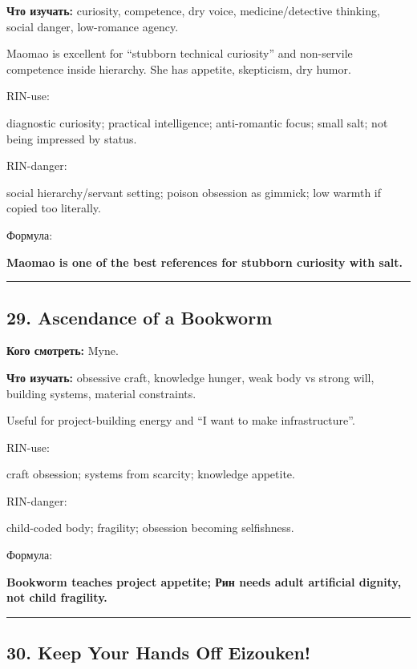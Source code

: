 \textbf{Что изучать:} curiosity, competence, dry voice,
medicine/\hspace{0pt}detective thinking, social danger, low-romance agency.

Maomao is excellent for ``stubborn technical curiosity'' and non-servile
competence inside hierarchy. She has appetite, skepticism, dry humor.

RIN-use:

diagnostic curiosity; practical intelligence; anti-romantic focus; small
salt; not being impressed by status.

RIN-danger:

social hierarchy/\hspace{0pt}servant setting; poison obsession as gimmick; low
warmth if copied too literally.

Формула:

\textbf{Maomao is one of the best references for stubborn curiosity with
salt.}

\begin{center}\rule{0.5\linewidth}{0.5pt}\end{center}

\subsection*{29. Ascendance of a Bookworm}

\textbf{Кого смотреть:} Myne.

\textbf{Что изучать:} obsessive craft, knowledge hunger, weak body vs
strong will, building systems, material constraints.

Useful for project-building energy and ``I want to make
infrastructure''.

RIN-use:

craft obsession; systems from scarcity; knowledge appetite.

RIN-danger:

child-coded body; fragility; obsession becoming selfishness.

Формула:

\textbf{Bookworm teaches project appetite; Рин needs adult artificial
dignity, not child fragility.}

\begin{center}\rule{0.5\linewidth}{0.5pt}\end{center}

\subsection*{30. Keep Your Hands Off Eizouken!}

